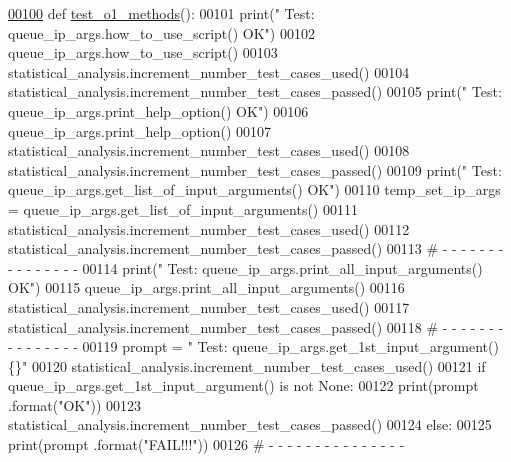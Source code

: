 \begin{DoxyCode}
\hypertarget{classutilities_1_1queue__ip__arguments__tester_1_1queue__ip__args__tester_l00100}{}\hyperlink{classutilities_1_1queue__ip__arguments__tester_1_1queue__ip__args__tester_a49bd049dbf616cc1f604d3c0cbe84c43}{00100}     \textcolor{keyword}{def }\hyperlink{classutilities_1_1queue__ip__arguments__tester_1_1queue__ip__args__tester_a49bd049dbf616cc1f604d3c0cbe84c43}{test\_o1\_methods}():
00101         print(\textcolor{stringliteral}{" Test: queue\_ip\_args.how\_to\_use\_script()         OK"})
00102         queue\_ip\_args.how\_to\_use\_script()
00103         statistical\_analysis.increment\_number\_test\_cases\_used()
00104         statistical\_analysis.increment\_number\_test\_cases\_passed()
00105         print(\textcolor{stringliteral}{" Test: queue\_ip\_args.print\_help\_option()         OK"})
00106         queue\_ip\_args.print\_help\_option()
00107         statistical\_analysis.increment\_number\_test\_cases\_used()
00108         statistical\_analysis.increment\_number\_test\_cases\_passed()
00109         print(\textcolor{stringliteral}{" Test: queue\_ip\_args.get\_list\_of\_input\_arguments()   OK"})
00110         temp\_set\_ip\_args = queue\_ip\_args.get\_list\_of\_input\_arguments()
00111         statistical\_analysis.increment\_number\_test\_cases\_used()
00112         statistical\_analysis.increment\_number\_test\_cases\_passed()
00113         \textcolor{comment}{#   -   -   -   -   -   -   -   -   -   -   -   -   -   -   -}
00114         print(\textcolor{stringliteral}{" Test: queue\_ip\_args.print\_all\_input\_arguments()     OK"})
00115         queue\_ip\_args.print\_all\_input\_arguments()
00116         statistical\_analysis.increment\_number\_test\_cases\_used()
00117         statistical\_analysis.increment\_number\_test\_cases\_passed()
00118         \textcolor{comment}{#   -   -   -   -   -   -   -   -   -   -   -   -   -   -   -}
00119         prompt = \textcolor{stringliteral}{"  Test: queue\_ip\_args.get\_1st\_input\_argument()        \{\}"}
00120         statistical\_analysis.increment\_number\_test\_cases\_used()
00121         \textcolor{keywordflow}{if} queue\_ip\_args.get\_1st\_input\_argument() \textcolor{keywordflow}{is} \textcolor{keywordflow}{not} \textcolor{keywordtype}{None}:
00122             print(prompt .format(\textcolor{stringliteral}{"OK"}))
00123             statistical\_analysis.increment\_number\_test\_cases\_passed()
00124         \textcolor{keywordflow}{else}:
00125             print(prompt .format(\textcolor{stringliteral}{"FAIL!!!"}))
00126         \textcolor{comment}{#   -   -   -   -   -   -   -   -   -   -   -   -   -   -   -}

\end{DoxyCode}
